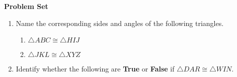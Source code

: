 \textbf{Problem Set}

\vspce

\begin{enumerate}[label = \Alph*. ]
\item \hspce Name the corresponding sides and angles of the following triangles. 

\begin{enumerate}[label = \arabic*. ]
\item $\bigtriangleup ABC\cong \bigtriangleup HIJ$
\item $\bigtriangleup JKL\cong \bigtriangleup XYZ$

\end{enumerate} 
\item \hspce Identify whether the following are \textbf{True} or \textbf{False} if $\triangle DAR \cong\triangle WIN$. 
\begin{enumerate}[label = \arabic*. ]
\end{enumerate} 
\end{enumerate}  